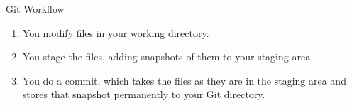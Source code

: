 \documentclass[10pt, compress]{beamer}
\begin{document}
\begin{frame}{Git Workflow}
	\begin{enumerate}
		\item You modify files in your working directory.
		\item You stage the files, adding snapshots of them to your staging area.
		\item You do a commit, which takes the files as they are in the staging area and stores that snapshot permanently to your Git directory.
	\end{enumerate}
\end{frame}
\end{document}

